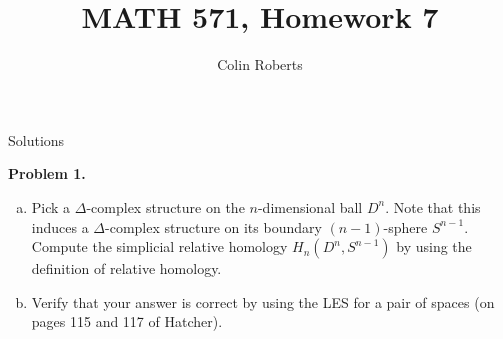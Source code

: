 \documentclass[leqno]{article}
\author{Colin Roberts}
\title{MATH 571, Homework 7}
\theoremstyle{nonumberplain}
\begin{document}
\maketitle
\begin{large}
\begin{center}
Solutions
\end{center}
\end{large}


\noindent\textbf{Problem 1.} 
\begin{enumerate}[(a)]
\item Pick a $\Delta$-complex structure on the $n$-dimensional ball $D^n$. Note that this induces a $\Delta$-complex structure on its boundary $(n-1)$-sphere $S^{n-1}$. Compute the simplicial relative homology $H_n(D^n, S^{n-1})$ by using the definition of relative homology.
\item Verify that your answer is correct by using the LES for a pair of spaces (on pages 115 and 117 of Hatcher).
\end{enumerate}
\end{document}
